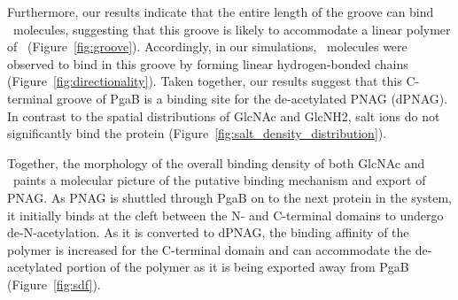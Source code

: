 Furthermore, our results indicate that the entire length of the groove can bind \glucosamine\ molecules, suggesting that this groove is likely to accommodate a linear polymer of \glucosamine\ (Figure~\ref{fig:groove}). Accordingly, in our simulations, \glucosamine\ molecules were observed to bind in this groove by forming linear hydrogen-bonded chains (Figure~\ref{fig:directionality}).  Taken together,  our results suggest that this C-terminal groove of PgaB is a binding site for the de-acetylated PNAG (dPNAG).   In contrast to the spatial distributions of GlcNAc and GlcNH2, salt ions do not significantly bind the protein  (Figure~\ref{fig:salt_density_distribution}). 

Together, the morphology of the overall binding density of both GlcNAc and \glucosamine\ paints a molecular picture of the putative binding mechanism and export of PNAG. As PNAG is shuttled through PgaB on to the next protein in the system, it initially binds at the cleft between the N- and C-terminal domains to undergo de-N-acetylation.  As it is converted to dPNAG, the binding affinity of the polymer is increased for the C-terminal domain and can accommodate the de-acetylated portion of the polymer as it is being exported away from PgaB (Figure~\ref{fig:sdf}).



